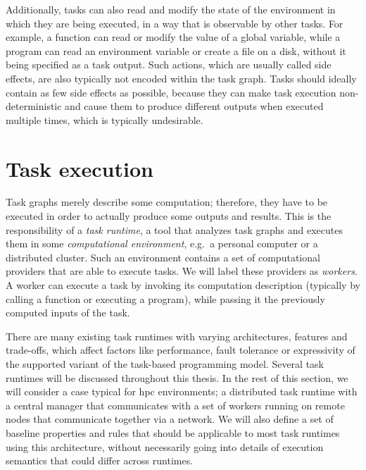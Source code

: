 Additionally, tasks can also read and modify the state of the environment in which they are being
executed, in a way that is observable by other tasks. For example, a function can read or modify
the value of a global variable, while a program can read an environment variable or create a file
on a disk, without it being specified as a task output. Such actions, which are usually called side
effects, are also typically not encoded within the task graph. Tasks should ideally contain as few
side effects as possible, because they can make task execution non-deterministic and cause them to
produce different outputs when executed multiple times, which is typically undesirable.

\section{Task execution}
\label{sec:task-graph-execution}
Task graphs merely describe some computation; therefore, they have to be executed in order to
actually produce some outputs and results. This is the responsibility of a \emph{task runtime},
a tool that analyzes task graphs and executes them in some \emph{computational environment}, e.g.\ a
personal computer or a distributed cluster. Such an environment contains a set of computational
providers that are able to execute tasks. We will label these providers as \emph{workers}.
A worker can execute a task by invoking its computation description (typically by calling a
function or executing a program), while passing it the previously computed inputs of the task.


There are many existing task runtimes with varying architectures, features and trade-offs, which
affect factors like performance, fault tolerance or expressivity of the supported variant of the
task-based programming model. Several task runtimes will be discussed throughout this thesis. In
the rest of this section, we will consider a case typical for \gls{hpc} environments;
a distributed task runtime with a central manager that communicates with a set of workers running
on remote nodes that communicate together via a network. We will also define a set of baseline
properties and rules that should be applicable to most task runtimes using this architecture,
without necessarily going into details of execution semantics that could differ across runtimes.

